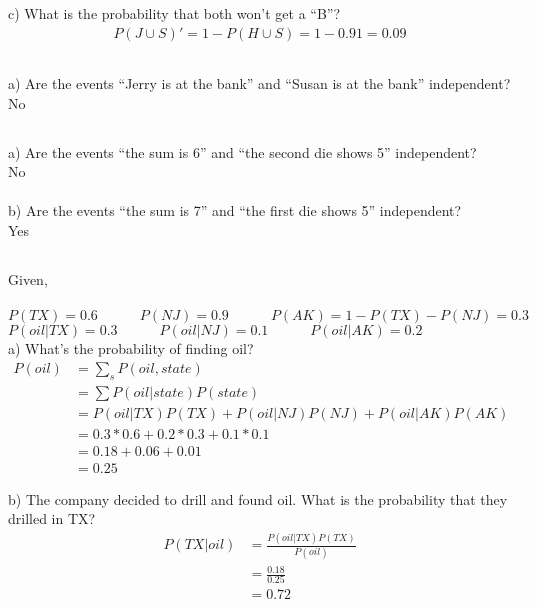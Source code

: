 \documentclass{exam}
\begin{document}
c) What is the probability that both won’t get a “B”?
\begin{align}
P(J \cup S)' = 1 - P(H \cup S) = 1 - 0.91 = 0.09
\end{align}

\newpage

\subsection{}
a) Are the events “Jerry is at the bank” and “Susan is at the bank” independent? \\ 
No

\subsection{}
a) Are the events “the sum is 6” and “the second die shows 5” independent? \\ 
No \\ \\ 
b) Are the events “the sum is 7” and “the first die shows 5” independent? \\ 
Yes 

\subsection {}
Given, \\ \\
$P(TX) = 0.6 \quad \quad \quad P(NJ) = 0.9 \quad \quad \quad P(AK) = 1 - P(TX) - P(NJ) =  0.3$ \\
$P(oil | TX) = 0.3 \quad \quad \quad P(oil | NJ) = 0.1 \quad \quad \quad P(oil | AK) = 0.2$ \\

a) What’s the probability of finding oil?
\begin{align}
P(oil) &= \sum_{s}P(oil, state) \\
         &= \sum P(oil | state)P(state) \\
         &= P(oil | TX) P(TX) + P(oil | NJ) P(NJ) + P(oil | AK) P(AK) \\
         &= 0.3*0.6 + 0.2*0.3 + 0.1*0.1 \\
         &= 0.18 + 0.06 + 0.01 \\
         &= 0.25
\end{align}

b) The company decided to drill and found oil. What is the probability that they drilled in TX?
\begin{align}
P(TX | oil) &=  \frac{P(oil | TX)P(TX)}{P(oil)} \\
	      &= \frac{0.18}{0.25} \\
	      &= 0.72
\end{align}
\end{document}
